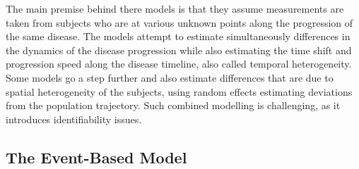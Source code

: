 The main premise behind there models is that they assume measurements are taken from subjects who are at various unknown points along the progression of the same disease. The models attempt to estimate simultaneously differences in the dynamics of the disease progression while also estimating the time shift and progression speed along the disease timeline, also called temporal heterogeneity. Some models go a step further and also estimate differences that are due to spatial heterogeneity of the subjects, using random effects estimating deviations from the population trajectory. Such combined modelling is challenging, as it introduces identifiability issues. 


\subsection{The Event-Based Model}
\label{sec:bckEbm}

